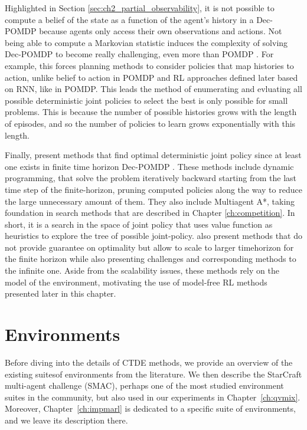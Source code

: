 Highlighted in Section \ref{sec:ch2_partial_observability}, it is not possible to compute a belief of the state as a function of the agent's history in a Dec-POMDP because agents only access their own observations and actions.
Not being able to compute a Markovian statistic induces the complexity of solving Dec-POMDP to become really challenging, even more than POMDP \citep{DecPomdp}.
For example, this forces planning methods to consider policies that map histories to action, unlike belief to action in POMDP and RL approaches defined later based on RNN, like in POMDP.
This leads the method of enumerating and evluating all possible deterministic joint policies to select the best is only possible for small problems.
This is because the number of possible histories grows with the length of episodes, and so the number of policies to learn grows exponentially with this length.

Finally, \cite{DecPomdp} present methods that find optimal deterministic joint policy since at least one exists in finite time horizon Dec-POMDP \citep{oliehoek2008optimal}.
These methods include dynamic programming, that solve the problem iteratively backward starting from the last time step of the finite-horizon, pruning computed policies along the way to reduce the large unnecessary amount of them.
They also include Multiagent A*, taking foundation in search methods \citep{russel2010} that are described in Chapter \ref{ch:competition}.
In short, it is a search in the space of joint policy that uses value function as heuristics to explore the tree of possible joint-policy.
\cite{DecPomdp} also present methods that do not provide guarantee on optimality but allow to scale to larger timehorizon for the finite horizon while also presenting challenges and corresponding methods to the infinite one.
Aside from the scalability issues, these methods rely on the model of the environment, motivating the use of model-free RL methods presented later in this chapter.

\section{Environments}
\label{sec:ch3_env}
Before diving into the details of CTDE methods, we provide an overview of the existing suites\footnotemark  of environments from the literature.
We then describe the StarCraft multi-agent challenge (SMAC), perhaps one of the most studied environment suites in the community, but also used in our experiments in Chapter~\ref{ch:qvmix}.
Moreover, Chapter~\ref{ch:impmarl} is dedicated to a specific suite of environments, and we leave its description there.

